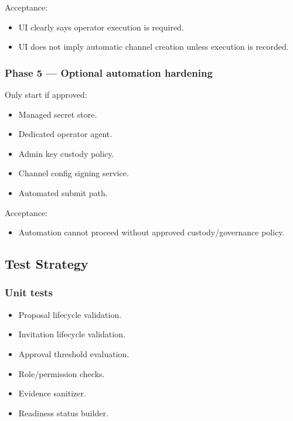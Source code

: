Acceptance:

\begin{itemize}
  \item UI clearly says operator execution is required.
  \item UI does not imply automatic channel creation unless execution is recorded.
\end{itemize}

\subsubsection{Phase 5 --- Optional automation hardening}

Only start if approved:

\begin{itemize}
  \item Managed secret store.
  \item Dedicated operator agent.
  \item Admin key custody policy.
  \item Channel config signing service.
  \item Automated submit path.
\end{itemize}

Acceptance:

\begin{itemize}
  \item Automation cannot proceed without approved custody/governance policy.
\end{itemize}

\subsection{Test Strategy}

\subsubsection{Unit tests}

\begin{itemize}
  \item Proposal lifecycle validation.
  \item Invitation lifecycle validation.
  \item Approval threshold evaluation.
  \item Role/permission checks.
  \item Evidence sanitizer.
  \item Readiness status builder.
\end{itemize}

